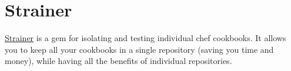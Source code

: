 \section{Strainer}
\label{sec:testing-strainer}

\href{https://github.com/customink/strainer}{Strainer} is a gem for isolating and testing individual chef cookbooks. It allows you to keep all your cookbooks in a single repository (saving you time and money), while having all the benefits of individual repositories.